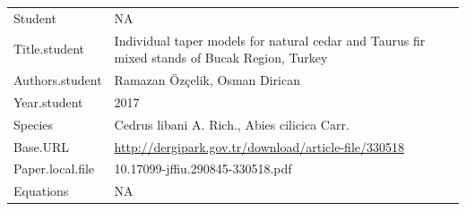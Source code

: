 \documentclass[]{article}
\begin{document}
\begin{longtable}[]{@{}ll@{}}
\toprule
\endhead
\begin{minipage}[t]{0.21\columnwidth}\raggedright
Student\strut
\end{minipage} & \begin{minipage}[t]{0.73\columnwidth}\raggedright
NA\strut
\end{minipage}\tabularnewline
\begin{minipage}[t]{0.21\columnwidth}\raggedright
Title.student\strut
\end{minipage} & \begin{minipage}[t]{0.73\columnwidth}\raggedright
Individual taper models for natural cedar and Taurus fir mixed stands of
Bucak Region, Turkey\strut
\end{minipage}\tabularnewline
\begin{minipage}[t]{0.21\columnwidth}\raggedright
Authors.student\strut
\end{minipage} & \begin{minipage}[t]{0.73\columnwidth}\raggedright
Ramazan Özçelik, Osman Dirican\strut
\end{minipage}\tabularnewline
\begin{minipage}[t]{0.21\columnwidth}\raggedright
Year.student\strut
\end{minipage} & \begin{minipage}[t]{0.73\columnwidth}\raggedright
2017\strut
\end{minipage}\tabularnewline
\begin{minipage}[t]{0.21\columnwidth}\raggedright
Species\strut
\end{minipage} & \begin{minipage}[t]{0.73\columnwidth}\raggedright
Cedrus libani A. Rich., Abies cilicica Carr.\strut
\end{minipage}\tabularnewline
\begin{minipage}[t]{0.21\columnwidth}\raggedright
Base.URL\strut
\end{minipage} & \begin{minipage}[t]{0.73\columnwidth}\raggedright
\url{http://dergipark.gov.tr/download/article-file/330518}\strut
\end{minipage}\tabularnewline
\begin{minipage}[t]{0.21\columnwidth}\raggedright
Paper.local.file\strut
\end{minipage} & \begin{minipage}[t]{0.73\columnwidth}\raggedright
10.17099-jffiu.290845-330518.pdf\strut
\end{minipage}\tabularnewline
\begin{minipage}[t]{0.21\columnwidth}\raggedright
Equations\strut
\end{minipage} & \begin{minipage}[t]{0.73\columnwidth}\raggedright
NA\strut
\end{minipage}\tabularnewline
\bottomrule
\end{longtable}
\end{document}
